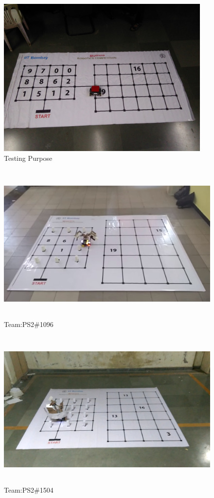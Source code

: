 \documentclass[10pt, a4paper]{beamer}
\begin{document}
\begin{frame}
	\begin{figure}[h!]
		\includegraphics[width=1\linewidth, height=8cm]{Homography/2.jpg}
		\centering
		\caption{Testing Purpose}
	\end{figure}	
\end{frame}
\begin{frame}
	\begin{figure}[h!]
		\includegraphics[width=1\linewidth, height=8cm]{Homography/3.png}
		\centering
		\caption{Team:PS2\#1096}
	\end{figure}	
\end{frame}
\begin{frame}
	\begin{figure}[h!]
		\includegraphics[width=1\linewidth, height=8cm]{Homography/4.jpg}
		\centering
		\caption{Team:PS2\#1504}
	\end{figure}	
\end{frame}
\end{document}
